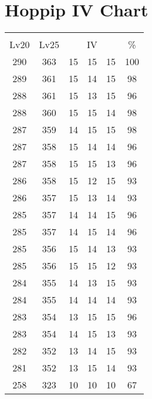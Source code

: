\documentclass{article}%
\begin{document}
%
\normalsize%
\section{Hoppip IV Chart}%
\label{sec:Hoppip IV Chart}%
\renewcommand{\arraystretch}{1.5}%
\begin{tabular}{|c|c|c|c|c|c|}%
\hline%
\multicolumn{6}{|c|}{\textcolor{white}{ 
\linebreak{Hoppip}
}%
\cellcolor{black}}\\%
\multicolumn{1}{|c}{Lv20}&\multicolumn{1}{c|}{Lv25}&\multicolumn{3}{c|}{IV}&\multicolumn{1}{|c|}{\%}\\%
\hline%
\rowcolor{color100}%
290&363&15&15&15&100\\%
\hline%
\rowcolor{color98}%
289&361&15&14&15&98\\%
\hline%
\rowcolor{color96}%
288&361&15&13&15&96\\%
\hline%
\rowcolor{color98}%
288&360&15&15&14&98\\%
\hline%
\rowcolor{color98}%
287&359&14&15&15&98\\%
\hline%
\rowcolor{color96}%
287&358&15&14&14&96\\%
\hline%
\rowcolor{color96}%
287&358&15&15&13&96\\%
\hline%
\rowcolor{color93}%
286&358&15&12&15&93\\%
\hline%
\rowcolor{color93}%
286&357&15&13&14&93\\%
\hline%
\rowcolor{color96}%
285&357&14&14&15&96\\%
\hline%
\rowcolor{color96}%
285&357&14&15&14&96\\%
\hline%
\rowcolor{color93}%
285&356&15&14&13&93\\%
\hline%
\rowcolor{color93}%
285&356&15&15&12&93\\%
\hline%
\rowcolor{color93}%
284&355&14&13&15&93\\%
\hline%
\rowcolor{color93}%
284&355&14&14&14&93\\%
\hline%
\rowcolor{color96}%
283&354&13&15&15&96\\%
\hline%
\rowcolor{color93}%
283&354&14&15&13&93\\%
\hline%
\rowcolor{color93}%
282&352&13&14&15&93\\%
\hline%
\rowcolor{color93}%
281&352&13&15&14&93\\%
\hline%
\rowcolor{color91}%
258&323&10&10&10&67\\%
\end{tabular}

%
\end{document}
